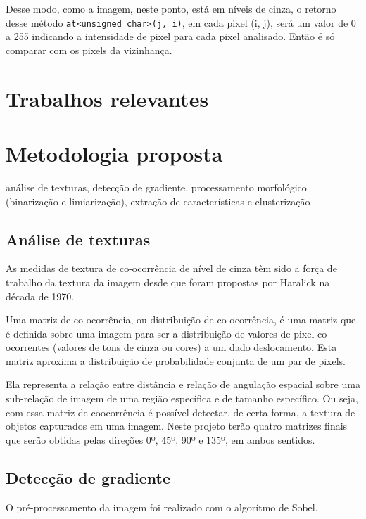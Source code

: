 \documentclass[10pt,twocolumn,letterpaper]{article}
\begin{document}
	Desse modo, como a imagem, neste ponto, está em níveis de cinza, o retorno
desse método \verb'at<unsigned char>(j, i)', em cada pixel (i, j), será um valor de
0 a 255 indicando a intensidade de pixel para cada pixel analisado. Então é só comparar
com os pixels da vizinhança.



\section{Trabalhos relevantes}



\section{Metodologia proposta}
análise de texturas, detecção de gradiente,
processamento morfológico (binarização e limiarização), extração de características
e clusterização

\subsection{Análise de texturas}

	As medidas de textura de co-ocorrência de nível de cinza têm sido a força de trabalho
da textura da imagem desde que foram propostas por Haralick{\footnotesize \cite{haralick}}
na década de 1970.

	Uma matriz de co-ocorrência, ou distribuição de co-ocorrência,{\footnotesize \cite{GLCM-tutorial}}
é uma matriz que é definida sobre uma imagem para ser a distribuição de valores de pixel
co-ocorrentes (valores de tons de cinza ou cores) a um dado deslocamento. Esta matriz
aproxima a distribuição de probabilidade conjunta de um par de pixels.

	Ela representa a relação entre distância e relação de angulação espacial sobre uma
sub-relação de imagem de uma região específica e de tamanho específico. Ou seja, com
essa matriz de coocorrência é possível detectar, de certa forma, a textura de objetos
capturados em uma imagem. Neste projeto terão quatro matrizes finais que serão obtidas
pelas direções 0º, 45º, 90º e 135º, em ambos sentidos.


\subsection{Detecção de gradiente}
	
	O pré-processamento da imagem foi realizado com o algorítmo de Sobel.
\end{document}
